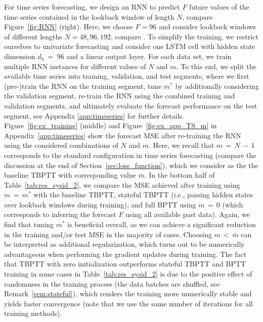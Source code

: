 \documentclass{article} %
\begin{document}
For time series forecasting, we design an RNN to predict $F$ future values of the time series contained in the lookback window of length $N$, compare Figure~\ref{fig:RNN} (right). Here, we choose $F=96$ and consider lookback windows of different lengths $N=48,96,192$, compare \citet{Wang2025}. To simplify the training, we restrict ourselves to univariate forecasting and consider one LSTM cell with hidden state dimension $d_h{\,=\;}96$ and a linear output layer.
For each data set, we train multiple RNN instances for different values of $N$ and $m$. To this end, we split the available time series into training, validation, and test segments, where we first (pre-)train the RNN on the training segment, tune $m^*$ by additionally considering the validation segment, re-train the RNN using the combined training and validation segments, and ultimately evaluate the forecast performance on the test segment, see Appendix \ref{app:timeseries} for further details.
Figure~\ref{fig:ex_training} (middle) and Figure~\ref{fig:ex_app_TS_m} in Appendix~\ref{app:timeseries} show the forecast MSE after re-training the RNN using the considered combinations of $N$ and $m$. Here, we recall that $m{\,=\,}N{\,-\,}1$ corresponds to the standard configuration in time series forecasting (compare the discussion at the end of Section~\ref{sec:loss_function}), which we consider as the the baseline TBPTT with corresponding value $\bar{m}$.
In the bottom half of Table~\ref{tab:res_sysid_2}, we compare the MSE achieved after training using ${m{\,=\,}m^*}$ with the baseline TBPTT, stateful TBPTT (i.e., passing hidden states over lookback windows during training), and full BPTT using $m{\,=\,}0$ (which corresponds to inferring the forecast $F$ using all available past data).
Again, we find that tuning $m^*$ is beneficial overall, as we can achieve a significant reduction in the training and/or test MSE in the majority of cases.
Choosing $m{\,<\,}\bar{m}$ can be interpreted as additional regularization, which turns out to be numerically advantageous when performing the gradient updates during training.
The fact that TBPTT with zero initialization outperforms stateful TBPTT and BPTT training in some cases in Table~\ref{tab:res_sysid_2} is due to the positive effect of randomness in the training process (the data batches are shuffled, see Remark~\ref{rem:stateful}), which renders the training more numerically stable and yields faster convergence (note that we use the same number of iterations for all training methods).
\end{document}
